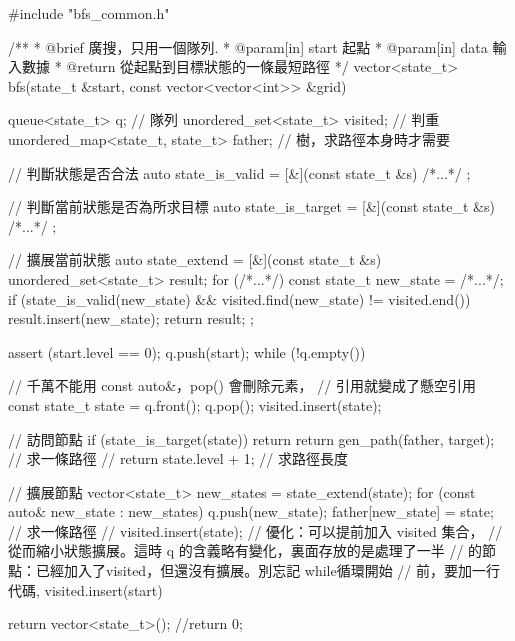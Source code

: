 \begin{Codex}[label=bfs_template.cpp]
#include "bfs_common.h"

/**
 * @brief 廣搜，只用一個隊列.
 * @param[in] start 起點
 * @param[in] data 輸入數據
 * @return 從起點到目標狀態的一條最短路徑
 */
vector<state_t> bfs(state_t &start, const vector<vector<int>> &grid) {
    queue<state_t> q; // 隊列
    unordered_set<state_t> visited; // 判重
    unordered_map<state_t, state_t> father; // 樹，求路徑本身時才需要

    // 判斷狀態是否合法
    auto state_is_valid = [&](const state_t &s) { /*...*/ };

    // 判斷當前狀態是否為所求目標
    auto state_is_target = [&](const state_t &s) { /*...*/ };

    // 擴展當前狀態
    auto state_extend = [&](const state_t &s) {
        unordered_set<state_t> result;
        for (/*...*/) {
            const state_t new_state = /*...*/;
            if (state_is_valid(new_state) && 
                    visited.find(new_state) != visited.end()) {
                result.insert(new_state);
            }
        }
        return result;
    };

    assert (start.level == 0);
    q.push(start);
    while (!q.empty()) {
        // 千萬不能用 const auto&，pop() 會刪除元素，
        // 引用就變成了懸空引用
        const state_t state = q.front();
        q.pop();
        visited.insert(state);

        // 訪問節點
        if (state_is_target(state)) {
            return return gen_path(father, target); // 求一條路徑
            // return state.level + 1; // 求路徑長度
        }

        // 擴展節點
        vector<state_t> new_states = state_extend(state);
        for (const auto& new_state : new_states) {
            q.push(new_state);
            father[new_state] = state;  // 求一條路徑
            // visited.insert(state); // 優化：可以提前加入 visited 集合，
            // 從而縮小狀態擴展。這時 q 的含義略有變化，裏面存放的是處理了一半
            // 的節點：已經加入了visited，但還沒有擴展。別忘記 while循環開始
            // 前，要加一行代碼, visited.insert(start)
        }
    }

    return vector<state_t>();
    //return 0;
}
\end{Codex}


